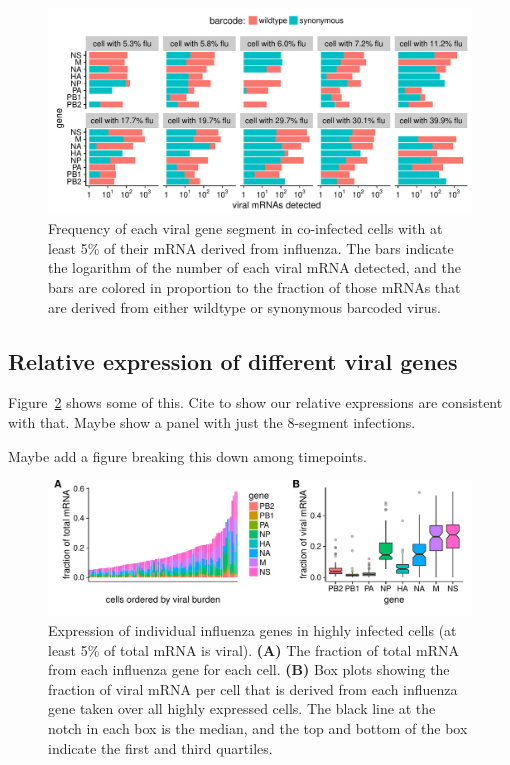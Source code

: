 \documentclass[9pt,lineno]{elife}
\begin{document}
\begin{figure}
\includegraphics[width=\linewidth]{figures/p_coinfection.pdf}
\caption{\label{fig:coexpression}
Frequency of each viral gene segment in co-infected cells with at least 5\% of their mRNA derived from influenza.
The bars indicate the logarithm of the number of each viral mRNA detected, and the bars are colored in proportion to the fraction of those mRNAs that are derived from either wildtype or synonymous barcoded virus.
}
\end{figure}

\subsection{Relative expression of different viral genes}
Figure~\ref{fig:fluexpr} shows some of this.
Cite \citet{hatada1989control} to show our relative expressions are consistent with that.
Maybe show a panel with just the 8-segment infections.

Maybe add a figure breaking this down among timepoints.

\begin{figure}
\includegraphics[width=\linewidth]{figures/p_flu_expr.pdf}
\caption{\label{fig:fluexpr}
Expression of individual influenza genes in highly infected cells (at least 5\% of total mRNA is viral).
{\bf (A)} 
The fraction of total mRNA from each influenza gene for each cell.
{\bf (B)}
Box plots showing the fraction of viral mRNA per cell that is derived from each influenza gene taken over all highly expressed cells.
The black line at the notch in each box is the median, and the top and bottom of the box indicate the first and third quartiles.
}
\end{figure}
\end{document}
